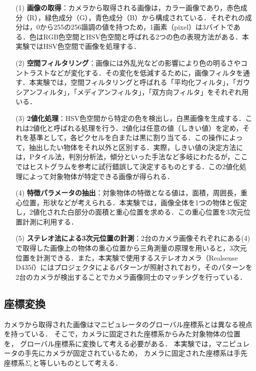 \begin{enumerate}
  \item[(1)] \textbf{画像の取得}：カメラから取得される画像は，カラー画像であり，赤色成分（R），緑色成分（G），青色成分（B）から構成されている．それぞれの成分は，0から255の256諧調の値を持つため，1画素（pixel）は3バイトである．色はRGB色空間とHSV色空間と呼ばれる2つの色の表現方法がある．本実験ではHSV色空間で画像を処理する．
    
  \item[(2)] \textbf{空間フィルタリング}：画像には外乱光などの影響により色の明るさやコントラストなどが変化する．その変化を低減するために，画像フィルタを通す．本実験では，空間フィルタリングと呼ばれる「平均化フィルタ」，「ガウシアンフィルタ」，「メディアンフィルタ」，「双方向フィルタ」をそれぞれ用いる．
    
  \item[(3)] \textbf{2値化処理}：HSV色空間から特定の色を検出し，白黒画像を生成する．これは2値化と呼ばれる処理を行う．2値化は任意の値（しきい値）を定め，それを基準として，各ピクセルを白または黒に割り当てる．この操作によって，抽出したい物体をそれ以外と区別する．実際，しきい値の決定方法には，Pタイル法，判別分析法，傾分といった手法など多岐にわたるが，ここではヒストグラムを参考に試行錯誤して決定するものとする．この2値化処理によって対象物体が特定できる画像が得られる．
    
  \item[(4)] \textbf{特徴パラメータの抽出}：対象物体の特徴となる値は，面積，周囲長，重心位置，形状などが考えられる．本実験では，画像全体を1つの物体と仮定し，2値化された白部分の面積と重心位置を求める．この重心位置を3次元位置計測に利用する．
    
  \item[(5)] \textbf{ステレオ法による3次元位置の計測}：2台のカメラ画像それぞれにある(4)で取得した画像上の物体の重心位置から三角測量の原理を用いると，3次元位置を計測できる．また，本実験で使用するステレオカメラ（Realsense D435f）にはプロジェクタによるパターンが照射されており，そのパターンを2台のカメラが検出することでカメラ画像同士のマッチングを行っている．
\end{enumerate}

\subsection{座標変換}
カメラから取得された画像はマニピュレータのグローバル座標系とは異なる視点を持っている．
そこで，カメラに固定された座標系からみた対象物体の位置を，
グローバル座標系に変換して考える必要がある．
本実験では，マニピュレータの手先にカメラが固定されているため，
カメラに固定された座標系は手先座標系$\Sigma_e$と等しいものとして考える．

